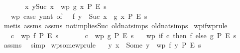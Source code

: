 \begin{isabellebody}
\ \ \ \ \ \ \ {\isachardoublequoteopen}{\isasymAnd}x{\isachardot}{\kern0pt}\ y{\isacharequal}{\kern0pt}Suc\ x\ {\isasymLongrightarrow}\ wp\ {\isacharparenleft}{\kern0pt}g\ x{\isacharparenright}{\kern0pt}\ P\ E\ s{\isachardoublequoteclose}\isanewline
\ \ \ {\isachardoublequoteopen}wp\ {\isacharparenleft}{\kern0pt}case\ y{\isacharcolon}{\kern0pt}{\isacharcolon}{\kern0pt}nat\ of\ {}\ {\isasymRightarrow}\ f\ y\ {\isacharbar}{\kern0pt}\ Suc\ x\ {\isasymRightarrow}\ g\ x{\isacharparenright}{\kern0pt}\ P\ E\ s{\isachardoublequoteclose}\isanewline
%
\isadelimproof
\ \ %
\endisadelimproof
%
\isatagproof
{}\isamarkupfalse%
\ {\isacharparenleft}{\kern0pt}metis\ assms{\isacharparenleft}{\kern0pt}{}{\isacharparenright}{\kern0pt}\ assms{\isacharparenleft}{\kern0pt}{}{\isacharparenright}{\kern0pt}\ not{}{\isacharunderscore}{\kern0pt}implies{\isacharunderscore}{\kern0pt}Suc\ old{\isachardot}{\kern0pt}nat{\isachardot}{\kern0pt}simps{\isacharparenleft}{\kern0pt}{}{\isacharparenright}{\kern0pt}\ old{\isachardot}{\kern0pt}nat{\isachardot}{\kern0pt}simps{\isacharparenleft}{\kern0pt}{}{\isacharparenright}{\kern0pt}{\isacharparenright}{\kern0pt}%
\endisatagproof
{\isafoldproof}%
%
\isadelimproof
\isanewline
%
\endisadelimproof
\isanewline
{}\isamarkupfalse%
\ wpif{\isacharbrackleft}{\kern0pt}wprule{\isacharbrackright}{\kern0pt}{\isacharcolon}{\kern0pt}\isanewline
\ \ \ {\isachardoublequoteopen}c\ {\isasymLongrightarrow}\ wp\ f\ P\ E\ s{\isachardoublequoteclose}\isanewline
\ \ \ \ \ \ \ {\isachardoublequoteopen}{\isasymnot}c\ {\isasymLongrightarrow}\ wp\ g\ P\ E\ s{\isachardoublequoteclose}\isanewline
\ \ \ {\isachardoublequoteopen}wp\ {\isacharparenleft}{\kern0pt}if\ c\ then\ f\ else\ g{\isacharparenright}{\kern0pt}\ P\ E\ s{\isachardoublequoteclose}\isanewline
%
\isadelimproof
\ \ %
\endisadelimproof
%
\isatagproof
{}\isamarkupfalse%
\ assms\ \isamarkupfalse%
\ simp%
\endisatagproof
{\isafoldproof}%
%
\isadelimproof
\isanewline
%
\endisadelimproof
\isanewline
{}\isamarkupfalse%
\ wpsome{\isacharbrackleft}{\kern0pt}wprule{\isacharbrackright}{\kern0pt}{\isacharcolon}{\kern0pt}\isanewline
\ \ \ {\isachardoublequoteopen}{\isasymAnd}y{\isachardot}{\kern0pt}\ x\ {\isacharequal}{\kern0pt}\ Some\ y\ {\isasymLongrightarrow}\ wp\ {\isacharparenleft}{\kern0pt}f\ y{\isacharparenright}{\kern0pt}\ P\ E\ s{\isachardoublequoteclose}\isanewline

\end{isabellebody}
